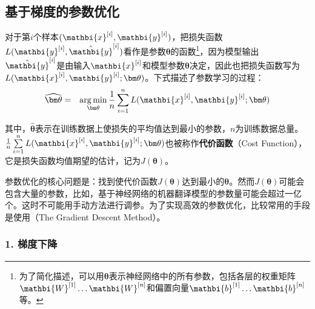 
\subsection{基于梯度的参数优化}\label{sec9:para-training}

\parinterval 对于第$ i $个样本$ ({\mathbi{x}}^{[i]},{\mathbi{y}}^{[i]}) $，把损失函数$ L({\mathbi{y}}^{[i]},{\hat{\mathbi{y}}}^{[i]}) $看作是参数$ \bm \theta $的函数\footnote{为了简化描述，可以用$
\bm{\theta} $表示神经网络中的所有参数，包括各层的权重矩阵${\mathbi{W}}^{[1]}\dots{\mathbi{W}}^{[n]}$和偏置向量${\mathbi{b}}^{[1]}\dots{\mathbi{b}}^{[n]}$等。}，因为模型输出$ {\hat{\mathbi{y}}}^{[i]}$是由输入$ {\mathbi{x}}^{[i]}$和模型参数$ \bm \theta $决定，因此也把损失函数写为$ L({\mathbi{x}}^{[i]},{\mathbi{y}}^{[i]};{\bm \theta}) $。下式描述了参数学习的过程：
\begin{eqnarray}
\widehat{\bm\theta}&=&\mathop{\arg\min}_{\bm \theta}\frac{1}{n}\sum_{i=1}^{n}{L({\mathbi{x}}^{[i]},{\mathbi{y}}^{[i]};{\bm \theta})}
\label{eq:9-28}
\end{eqnarray}

\noindent 其中，$ \widehat{\bm \theta} $表示在训练数据上使损失的平均值达到最小的参数，$n$为训练数据总量。$ \frac{1}{n}\sum \limits_{i=1}^{n}{L({\mathbi{x}}^{[i]},{\mathbi{y}}^{[i]};{\bm \theta})} $也被称作{\small\sffamily\bfseries{代价函数}}（Cost Function），它是损失函数均值期望的估计，记为$ J({\bm \theta}) $。

\parinterval 参数优化的核心问题是：找到使代价函数$ J({\bm\theta}) $达到最小的$ \bm \theta $。然而$ J({\bm\theta}) $可能会包含大量的参数，比如，基于神经网络的机器翻译模型的参数量可能会超过一亿个。这时不可能用手动方法进行调参。为了实现高效的参数优化，比较常用的手段是使用{\small{}}（The Gradient Descent Method）。


\subsubsection{1. 梯度下降}

